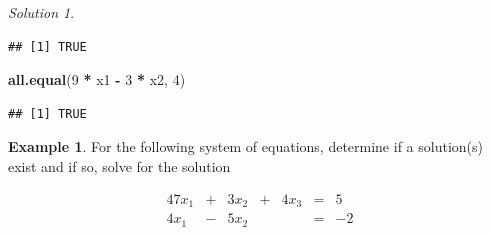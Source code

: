 \documentclass[
]{book}
\newenvironment{Shaded}{\begin{snugshade}}{\end{snugshade}}
\newcommand{\DecValTok}[1]{\textcolor[rgb]{0.00,0.00,0.81}{#1}}
\newcommand{\KeywordTok}[1]{\textcolor[rgb]{0.13,0.29,0.53}{\textbf{#1}}}
\newcommand{\NormalTok}[1]{#1}
\newcommand{\OperatorTok}[1]{\textcolor[rgb]{0.81,0.36,0.00}{\textbf{#1}}}
\newcommand{\StringTok}[1]{\textcolor[rgb]{0.31,0.60,0.02}{#1}}
\theoremstyle{definition}
\theoremstyle{definition}
\newtheorem{example}{Example}[chapter]
\theoremstyle{definition}
\theoremstyle{definition}
\theoremstyle{remark}
\newtheorem*{solution}{Solution}
\begin{document}
\begin{solution}
\begin{verbatim}
## [1] TRUE
\end{verbatim}

\begin{Shaded}
\begin{Highlighting}[]
\KeywordTok{all.equal}\NormalTok{(}\DecValTok{9} \OperatorTok{*}\StringTok{ }\NormalTok{x1 }\OperatorTok{-}\StringTok{ }\DecValTok{3} \OperatorTok{*}\StringTok{ }\NormalTok{x2, }\DecValTok{4}\NormalTok{)}
\end{Highlighting}
\end{Shaded}

\begin{verbatim}
## [1] TRUE
\end{verbatim}

\end{solution}

\begin{example}
For the following system of equations, determine if a solution(s) exist and if so, solve for the solution

\begin{alignat*}{4}
7 x_1 & {}+{} & 3 x_2 & {}+{} & 4 x_3 & {}={} & 5\\
4 x_1 & {}-{} & 5 x_2 &&        & {}={} & -2
\end{alignat*}
\end{example}
\end{document}
